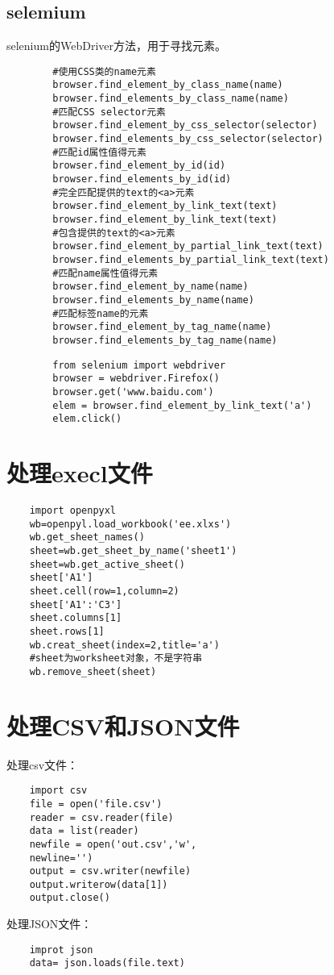 \documentclass[twocolumn]{article}
\begin{document}
	\subsection{selemium}{}
	selenium的WebDriver方法，用于寻找元素。
	\begin{lstlisting}
		#使用CSS类的name元素
		browser.find_element_by_class_name(name)
		browser.find_elements_by_class_name(name)
		#匹配CSS selector元素
		browser.find_element_by_css_selector(selector)
		browser.find_elements_by_css_selector(selector)
		#匹配id属性值得元素
		browser.find_element_by_id(id)
		browser.find_elements_by_id(id)
		#完全匹配提供的text的<a>元素
		browser.find_element_by_link_text(text)
		browser.find_element_by_link_text(text)
		#包含提供的text的<a>元素
		browser.find_element_by_partial_link_text(text)
		browser.find_elements_by_partial_link_text(text)
		#匹配name属性值得元素
		browser.find_element_by_name(name)
		browser.find_elements_by_name(name)
		#匹配标签name的元素
		browser.find_element_by_tag_name(name)
		browser.find_elements_by_tag_name(name)
	\end{lstlisting}
	\begin{lstlisting}
		from selenium import webdriver
		browser = webdriver.Firefox()
		browser.get('www.baidu.com')
		elem = browser.find_element_by_link_text('a')
		elem.click()
	\end{lstlisting}
	\twocolumn
	\section{处理execl文件}
	\begin{lstlisting}
	import openpyxl
	wb=openpyl.load_workbook('ee.xlxs')
	wb.get_sheet_names()
	sheet=wb.get_sheet_by_name('sheet1')
	sheet=wb.get_active_sheet()
	sheet['A1']
	sheet.cell(row=1,column=2)
	sheet['A1':'C3']
	sheet.columns[1]
	sheet.rows[1]
	wb.creat_sheet(index=2,title='a')
	#sheet为worksheet对象，不是字符串
	wb.remove_sheet(sheet)
	\end{lstlisting}
	\section{处理CSV和JSON文件}
	\noindent 处理csv文件：
	\begin{lstlisting}
	import csv
	file = open('file.csv')
	reader = csv.reader(file)
	data = list(reader)
	newfile = open('out.csv','w',
	newline='')
	output = csv.writer(newfile)
	output.writerow(data[1])
	output.close()
	\end{lstlisting}
	处理JSON文件：
	\begin{lstlisting}
	improt json
	data= json.loads(file.text)
	\end{lstlisting}
\end{document}

